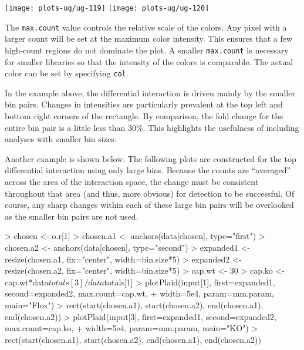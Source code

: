 \documentclass[12pt]{report}
\renewenvironment{Schunk}{\vspace{0pt}}{\vspace{0pt}}
\newcommand{\code}[1]{{\small\texttt{#1}}}
\begin{document}
\begin{center}
\texttt{[image: plots-ug/ug-119]}
\texttt{[image: plots-ug/ug-120]}
\end{center}

The \code{max.count} value controls the relative scale of the colors. 
Any pixel with a larger count will be set at the maximum color intensity.
This ensures that a few high-count regions do not dominate the plot.
A smaller \code{max.count} is necessary for smaller libraries so that the intensity of the colors is comparable.
The actual color can be set by specifying \code{col}.

In the example above, the differential interaction is driven mainly by the smaller bin pairs.
Changes in intensities are particularly prevalent at the top left and bottom right corners of the rectangle.
By comparison, the fold change for the entire bin pair is a little less than 30\%.
This highlights the usefulness of including analyses with smaller bin sizes.

Another example is shown below.
The following plots are constructed for the top differential interaction using only large bins.
Because the counts are ``averaged'' across the area of the interaction space, the change must be consistent throughout that area (and thus, more obvious) for detection to be successful.
Of course, any sharp changes within each of these large bin pairs will be overlooked as the smaller bin pairs are not used.




\begin{Schunk}
\begin{Sinput}
> chosen <- o.r[1]
> chosen.a1 <- anchors(data[chosen], type="first")
> chosen.a2 <- anchors(data[chosen], type="second")
> expanded1 <- resize(chosen.a1, fix="center", width=bin.size*5)
> expanded2 <- resize(chosen.a2, fix="center", width=bin.size*5)
> cap.wt <- 30
> cap.ko <- cap.wt*data$totals[3]/data$totals[1]
> plotPlaid(input[1], first=expanded1, second=expanded2, max.count=cap.wt, 
+     width=5e4, param=mm.param, main="Flox")
> rect(start(chosen.a1), start(chosen.a2), end(chosen.a1), end(chosen.a2))
> plotPlaid(input[3], first=expanded1, second=expanded2, max.count=cap.ko, 
+     width=5e4, param=mm.param, main="KO")
> rect(start(chosen.a1), start(chosen.a2), end(chosen.a1), end(chosen.a2))
\end{Sinput}
\end{Schunk}
\end{document}
